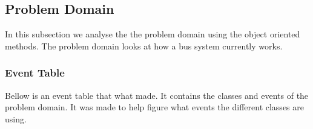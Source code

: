 \subsection{Problem Domain}
In this subsection we analyse the the problem domain using the object oriented methods. The problem domain looks at how a bus system currently works.

\subsubsection{Event Table}

Bellow is an event table that what made. It contains the classes and events of the problem domain. It was made to help figure what events the different classes are using.

\begin{table}[H]
\centering
\label{event-table}
\end{table}
